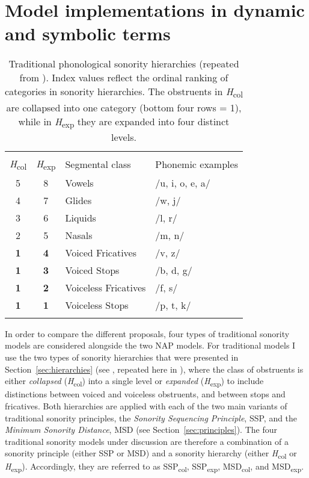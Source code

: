 \section{Model implementations in dynamic and symbolic terms}\label{sec:modelimpOLD}

\begin{table}
\caption{\label{tab:hierarchy_rep}Traditional phonological sonority hierarchies (repeated from ). 
Index values reflect the ordinal ranking of categories in sonority hierarchies. The obstruents in \emph{H}\textsubscript{col} are collapsed into one category (bottom four rows = 1), while in \emph{H}\textsubscript{exp} they are expanded into four distinct levels.}
\begin{tabular}{ccll}
\lsptoprule
\multicolumn{2}{c}{{Sonority index}} & &\\\cmidrule(lr){1-2}
\multicolumn{1}{c}{\emph{H}\textsubscript{col}} & \multicolumn{1}{c}{\emph{H}\textsubscript{exp}} & Segmental class & Phonemic examples\\
\midrule
5 & 8 & Vowels & \multicolumn{1}{l}{/u, i, o, e, a/}\\
4 & 7 & Glides & \multicolumn{1}{l}{/w, j/}\\
3 & 6 & Liquids & \multicolumn{1}{l}{/l, r/}\\
2 & 5 & Nasals & \multicolumn{1}{l}{/m, n/}\\
\textbf{1} & \textbf{4} & Voiced Fricatives & \multicolumn{1}{l}{/v, z/}\\
\textbf{1}& \textbf{3} & Voiced Stops & \multicolumn{1}{l}{/b, d, g/}\\
\textbf{1}& \textbf{2} & Voiceless Fricatives & \multicolumn{1}{l}{/f, s/}\\
\textbf{1}&\textbf{1} & Voiceless Stops & \multicolumn{1}{l}{/p, t, k/}\\
\lspbottomrule
\end{tabular}
\end{table}

In order to compare the different proposals, four types of traditional sonority models are considered alongside the two NAP models.
For traditional models I use the two types of sonority hierarchies that were presented in Section~\ref{sec:hierarchies} (see , repeated here in ), where the class of obstruents is either \emph{collapsed} (\emph{H}\textsubscript{col}) into a single level or \emph{expanded} (\emph{H}\textsubscript{exp}) to include distinctions between voiced and voiceless obstruents, and between stops and fricatives.
Both hierarchies are applied with each of the two main variants of traditional sonority principles, the \emph{Sonority Sequencing Principle}, SSP, and the \emph{Minimum Sonority Distance}, MSD (see Section~\ref{sec:principles}).
The four traditional sonority models under discussion are therefore a combination of a sonority principle (either SSP or MSD) and a sonority hierarchy (either \emph{H}\textsubscript{col} or \emph{H}\textsubscript{exp}). Accordingly, they are referred to as SSP\textsubscript{col}, SSP\textsubscript{exp}, MSD\textsubscript{col}, and MSD\textsubscript{exp}.

